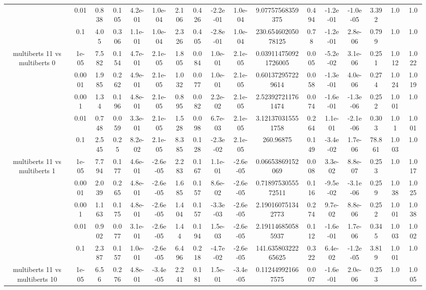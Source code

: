 \begin{tabular}{|c|c|c|c|c|c|c|c|c|c|c|c|c|c|c|c|c|}
 & 0.01 & 0.838 & 0.105 & 4.2e-01 & 1.0e-04 & 2.106 & 0.426 & -2.2e-01 & 1.0e-04 & 9.07757568359375 & 0.494 & -1.2e-01 & -1.0e-05 & 3.392 & 1.0 & 1.0 \\
 & 0.1 & 4.05 & 0.306 & 1.1e-01 & 1.0e-04 & 2.326 & 0.405 & -2.8e-01 & 1.0e-04 & 230.65460205078125 & 0.78 & -1.2e-01 & 2.8e-06 & 0.799 & 1.0 & 1.0 \\
\hline
\multirow{5}{*}{multiberts 11 vs multiberts 0} & 1e-05 & 7.582 & 0.154 & 4.7e-01 & 2.1e-05 & 1.805 & 0.084 & 1.0e-01 & 2.1e-05 & 0.039114750921726005 & 0.005 & -5.2e-02 & 3.1e-06 & 0.251 & 1.012 & 1.022 \\
 & 0.0001 & 1.985 & 0.262 & 4.9e-01 & 2.1e-05 & 1.032 & 0.077 & 1.0e-01 & 2.1e-05 & 0.601372957229614 & 0.058 & -1.3e-01 & 4.0e-06 & 0.274 & 1.024 & 1.019 \\
 & 0.001 & 1.34 & 0.196 & 4.8e-01 & 2.1e-05 & 0.895 & 0.082 & 2.2e-02 & 2.1e-05 & 2.523927211761474 & 0.074 & -1.6e-01 & -1.3e-06 & 0.252 & 1.001 & 1.0 \\
 & 0.01 & 0.748 & 0.059 & 3.3e-01 & 2.1e-05 & 1.528 & 0.098 & 6.7e-03 & 2.1e-05 & 3.121370315551758 & 0.264 & 1.1e-01 & -2.1e-06 & 0.303 & 1.01 & 1.001 \\
 & 0.1 & 2.545 & 0.25 & 8.2e-02 & 2.1e-05 & 8.385 & 0.128 & -2.3e-02 & 2.1e-05 & 260.96875 & 0.149 & -3.4e-02 & 1.7e-06 & 78.861 & 1.003 & 1.0 \\
\hline
\multirow{5}{*}{multiberts 11 vs multiberts 1} & 1e-05 & 7.794 & 0.177 & 4.6e-01 & -2.6e-05 & 2.283 & 0.167 & 1.1e-01 & -2.6e-05 & 0.06653869152069 & 0.008 & 3.3e-02 & 8.8e-07 & 0.253 & 1.0 & 1.017 \\
 & 0.0001 & 2.039 & 0.265 & 4.8e-01 & -2.6e-05 & 1.685 & 0.157 & 8.6e-02 & -2.6e-05 & 0.7189753055572511 & 0.116 & -9.5e-02 & -3.1e-06 & 0.259 & 1.038 & 1.025 \\
 & 0.001 & 1.163 & 0.175 & 4.8e-01 & -2.6e-05 & 1.404 & 0.157 & -3.3e-03 & -2.6e-05 & 2.190160751342773 & 0.274 & 9.7e-02 & 8.8e-06 & 0.252 & 1.001 & 1.038 \\
 & 0.01 & 0.902 & 0.077 & 3.1e-01 & -2.6e-05 & 1.44 & 0.194 & 1.5e-03 & -2.6e-05 & 2.191146850585937 & 0.112 & -1.6e-01 & 1.7e-06 & 0.345 & 1.003 & 1.002 \\
 & 0.1 & 2.387 & 0.157 & 1.0e-01 & -2.6e-05 & 6.496 & 0.218 & -4.7e-02 & -2.6e-05 & 141.63580322265625 & 0.322 & 6.4e-02 & -1.2e-05 & 3.819 & 1.001 & 1.0 \\
\hline
\multirow{5}{*}{multiberts 11 vs multiberts 10} & 1e-05 & 6.56 & 0.276 & 4.8e-01 & -3.4e-05 & 2.241 & 0.181 & 1.5e-01 & -3.4e-05 & 0.112449921667575 & 0.007 & -1.6e-01 & 2.0e-06 & 0.253 & 1.0 & 1.005 \\

\end{tabular}
